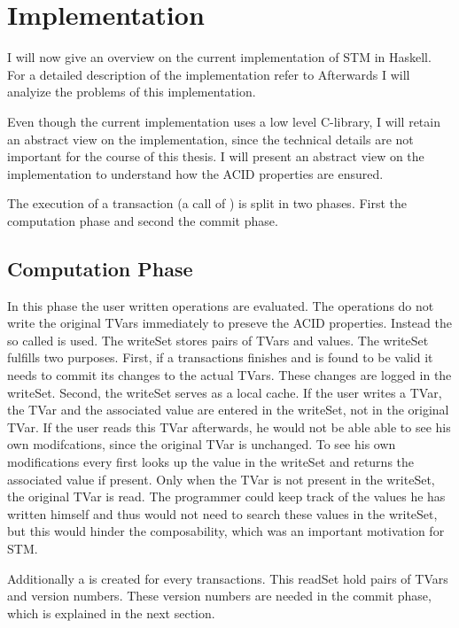   
\section{Implementation}
I will now give an overview on the current implementation of STM in Haskell. For a detailed description of the implementation refer to \parencite{STMBase}
Afterwards I will analyize the problems of this implementation.

Even though the current implementation uses a low level C-library, I will retain an abstract view on the implementation, since the technical 
details are not important for the course of this thesis. I will present an abstract view on the implementation to understand how the ACID 
properties are ensured.

The execution of a transaction (a call of ) is split in two phases. First the computation phase and second the commit phase. 
 
\subsection{Computation Phase}
In this phase the user written operations are evaluated. The  operations do not write the original TVars immediately to
preseve the ACID properties. Instead the so called  is used. The writeSet stores pairs of TVars and values. The 
writeSet fulfills two purposes. First, if a transactions finishes and is found to be valid it needs to commit its changes to the 
actual TVars. These changes are logged in the writeSet. Second, the writeSet serves as a local cache. If the user writes a TVar, 
the TVar and the associated value are entered in the writeSet, not in the original TVar. If the user reads this TVar afterwards, he 
would not be able able to see his own modifcations, since the original TVar is unchanged. To see his own modifications every 
 first looks up the value in the writeSet and returns the associated value if present. Only when the TVar is not 
present in the writeSet, the original TVar is read. The programmer could keep track of the values he has written himself and thus 
would not need to search these values in the writeSet, but this would hinder the composability, which was an important motivation
for STM.

Additionally a  is created for every transactions. This readSet hold pairs of TVars and version numbers. These
version numbers are needed in the commit phase, which is explained in the next section.

